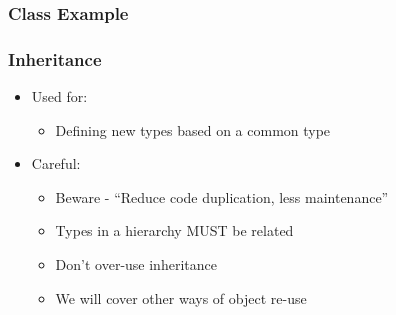 \hypertarget{class-example-1}{%
\subsubsection{Class Example}\label{class-example-1}}

\begin{Shaded}
\begin{Highlighting}[]

\NormalTok{: }
  


  \NormalTok{;}
  \NormalTok{;}

  \NormalTok{+(}

\NormalTok{: }
   \NormalTok{;}
   \NormalTok{;}
\NormalTok{\};}
\end{Highlighting}
\end{Shaded}

\hypertarget{inheritance}{%
\subsubsection{Inheritance}\label{inheritance}}

\begin{itemize}
\tightlist
\item
  Used for:

  \begin{itemize}
  \tightlist
  \item
    Defining new types based on a common type
  \end{itemize}
\item
  Careful:

  \begin{itemize}
  \tightlist
  \item
    Beware - ``Reduce code duplication, less maintenance''
  \item
    Types in a hierarchy MUST be related
  \item
    Don't over-use inheritance
  \item
    We will cover other ways of object re-use
  \end{itemize}
\end{itemize}

